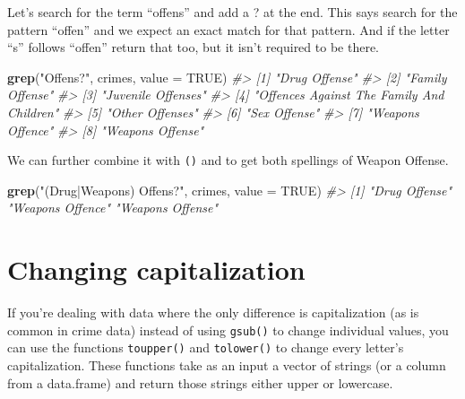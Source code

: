 \documentclass[
  12pt,
]{book}
\newenvironment{Shaded}{\begin{snugshade}}{\end{snugshade}}
\newcommand{\CommentTok}[1]{\textcolor[rgb]{0.37,0.37,0.37}{\textit{#1}}}
\newcommand{\DataTypeTok}[1]{\textcolor[rgb]{0.27,0.27,0.27}{#1}}
\newcommand{\KeywordTok}[1]{\textcolor[rgb]{0.27,0.27,0.27}{\textbf{#1}}}
\newcommand{\NormalTok}[1]{#1}
\newcommand{\OtherTok}[1]{\textcolor[rgb]{0.37,0.37,0.37}{#1}}
\newcommand{\StringTok}[1]{\textcolor[rgb]{0.5,0.5,0.5}{#1}}
\begin{document}
Let's search for the term ``offens'' and add a ? at the end. This says search for the pattern ``offen'' and we expect an exact match for that pattern. And if the letter ``s'' follows ``offen'' return that too, but it isn't required to be there.

\begin{Shaded}
\begin{Highlighting}[]
\KeywordTok{grep}\NormalTok{(}\StringTok{"Offens?"}\NormalTok{, crimes, }\DataTypeTok{value =} \OtherTok{TRUE}\NormalTok{)}
\CommentTok{\#> [1] "Drug Offense"                            }
\CommentTok{\#> [2] "Family Offense"                          }
\CommentTok{\#> [3] "Juvenile Offenses"                       }
\CommentTok{\#> [4] "Offences Against The Family And Children"}
\CommentTok{\#> [5] "Other Offenses"                          }
\CommentTok{\#> [6] "Sex Offense"                             }
\CommentTok{\#> [7] "Weapons Offence"                         }
\CommentTok{\#> [8] "Weapons Offense"}
\end{Highlighting}
\end{Shaded}

We can further combine it with \texttt{()} and \texttt{\textbar{}} to get both spellings of Weapon Offense.

\begin{Shaded}
\begin{Highlighting}[]
\KeywordTok{grep}\NormalTok{(}\StringTok{"(Drug|Weapons) Offens?"}\NormalTok{, crimes, }\DataTypeTok{value =} \OtherTok{TRUE}\NormalTok{)}
\CommentTok{\#> [1] "Drug Offense"    "Weapons Offence" "Weapons Offense"}
\end{Highlighting}
\end{Shaded}

\hypertarget{changing-capitalization}{%
\section{Changing capitalization}\label{changing-capitalization}}

If you're dealing with data where the only difference is capitalization (as is common in crime data) instead of using \texttt{gsub()} to change individual values, you can use the functions \texttt{toupper()} and \texttt{tolower()} to change every letter's capitalization. These functions take as an input a vector of strings (or a column from a data.frame) and return those strings either upper or lowercase.
\end{document}
